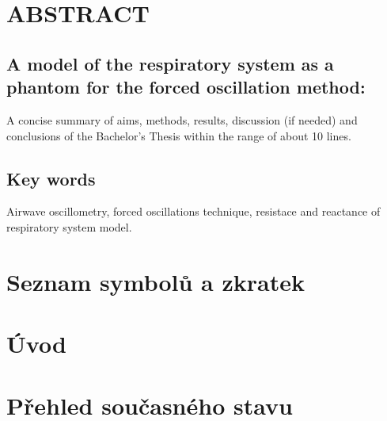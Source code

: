 \documentclass[a4paper,12pt]{article}   %
\numberwithin{equation}{section}        %
\newcommand{\nazevENG}{A model of the respiratory system as a phantom for the forced oscillation method}
\begin{document}
		
	\null\vfill	
	\section*{ABSTRACT}
        \subsection*{\nazevENG:}
		 
        A concise summary of aims, methods, results, discussion (if needed) and conclusions of the Bachelor’s Thesis within the range of about 10 lines.
    
	\subsection*{Key words}
		Airwave oscillometry, forced oscillations technique, resistace and reactance of respiratory system model.
	\clearpage
	
    \pagestyle{plain}	%
	
	\tableofcontents			%
        \listoftables

	\clearpage

	\section*{Seznam symbolů a zkratek} %
	
	\clearpage
		
	
		
	
	
	
	\section{Úvod}
	
	\clearpage
	
	\section{Přehled současného stavu}
	
	\clearpage
	
\end{document}
